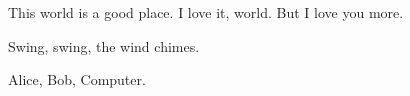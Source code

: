 This world is a good place.
I love it, world.
But I love you more.

Swing, swing, the wind chimes.

Alice, Bob, Computer.